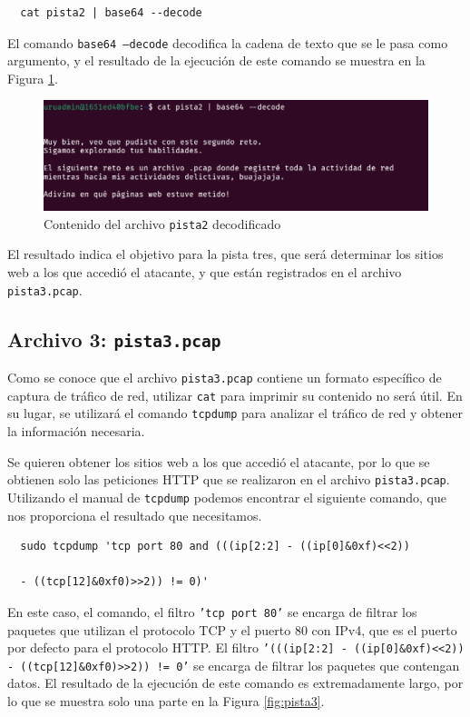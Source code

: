 \documentclass{article}
\begin{document}
\begin{verbatim}
  cat pista2 | base64 --decode
\end{verbatim}

El comando \texttt{base64 --decode} decodifica la cadena de texto que se le pasa como argumento, y el resultado de la ejecución de este comando se muestra en la Figura \ref{fig:pista2_decoded}.

\begin{figure}[ht!]
  \includegraphics[width=\textwidth]{pista2_decoded.png}
  \caption{Contenido del archivo \texttt{pista2} decodificado}
  \label{fig:pista2_decoded}
\end{figure}

El resultado indica el objetivo para la pista tres, que será determinar los sitios web a los que accedió el atacante, y que están registrados en el archivo \texttt{pista3.pcap}.

\subsection{Archivo 3: \texttt{pista3.pcap}}

Como se conoce que el archivo \texttt{pista3.pcap} contiene un formato específico de captura de tráfico de red, utilizar \texttt{cat} para imprimir su contenido no será útil. En su lugar, se utilizará el comando \texttt{tcpdump} para analizar el tráfico de red y obtener la información necesaria.

Se quieren obtener los sitios web a los que accedió el atacante, por lo que se obtienen solo las peticiones HTTP que se realizaron en el archivo \texttt{pista3.pcap}. Utilizando el manual de \texttt{tcpdump} \cite{thetcpdumpgroup_2020_tcpdump1} podemos encontrar el siguiente
comando, que nos proporciona el resultado que necesitamos.

\begin{verbatim}
  sudo tcpdump 'tcp port 80 and (((ip[2:2] - ((ip[0]&0xf)<<2)) 
  
  - ((tcp[12]&0xf0)>>2)) != 0)'
\end{verbatim}

En este caso, el comando, el filtro \texttt{'tcp port 80'} se encarga de filtrar los paquetes que utilizan el protocolo TCP y el puerto 80 con IPv4, que es el puerto por defecto para el protocolo HTTP. El filtro \texttt{'(((ip[2:2] - ((ip[0]\&0xf)<<2)) - ((tcp[12]\&0xf0)>>2)) != 0'} se encarga de filtrar los paquetes que contengan datos. El resultado de la ejecución de este comando es extremadamente largo, por lo que se muestra solo una parte en la Figura \ref{fig:pista3}.
\end{document}
